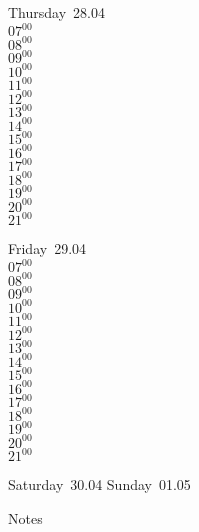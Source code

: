 \documentclass[11pt,a4paper]{book}\usepackage[]{graphicx}\usepackage[]{color}
\begin{document}
\clearpage
\begin{headerbox}
\end{headerbox}
\begin{weekdaybox}
  Thursday~28.04\\
  { 
  \vfill
  $07^{00}$\\
$08^{00}$\\
$09^{00}$\\
$10^{00}$\\
$11^{00}$\\
$12^{00}$\\
$13^{00}$\\
$14^{00}$\\
$15^{00}$\\
$16^{00}$\\
$17^{00}$\\
$18^{00}$\\
$19^{00}$\\
$20^{00}$\\
$21^{00}$\\
  }
\end{weekdaybox} 
\begin{weekdaybox}
  Friday~29.04\\
  { 
  \vfill
  $07^{00}$\\
$08^{00}$\\
$09^{00}$\\
$10^{00}$\\
$11^{00}$\\
$12^{00}$\\
$13^{00}$\\
$14^{00}$\\
$15^{00}$\\
$16^{00}$\\
$17^{00}$\\
$18^{00}$\\
$19^{00}$\\
$20^{00}$\\
$21^{00}$\\
  }
\end{weekdaybox}
\begin{weekendbox}
  Saturday~30.04
  \tcblower
  Sunday~01.05
\end{weekendbox} %
\begin{notebox}
  Notes
\end{notebox}
\clearpage
\end{document}
